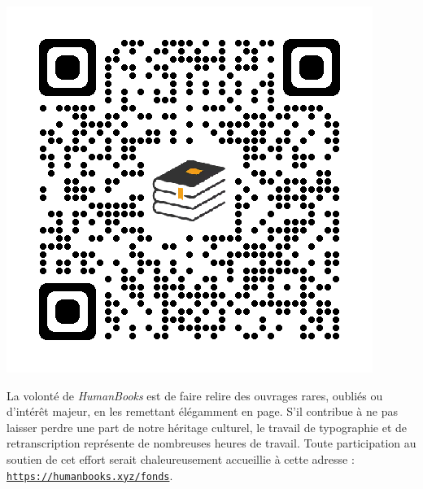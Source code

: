 \newpage
\begin{center}
\includegraphics[scale=0.25]{images/_QR_code-HumanBooks_fonds.png}
\end{center}
\par La volonté de \emph{HumanBooks} est de faire relire des ouvrages rares, oubliés ou d'intérêt majeur, en les remettant élégamment en page. S'il contribue à ne pas laisser perdre une part de notre héritage culturel, le travail de typographie et de retranscription représente de nombreuses heures de travail. Toute participation au soutien de cet effort serait chaleureusement accueillie à cette adresse : \href{https://humanbooks.xyz/fonds}{\texttt{https://humanbooks.xyz/fonds}}.
